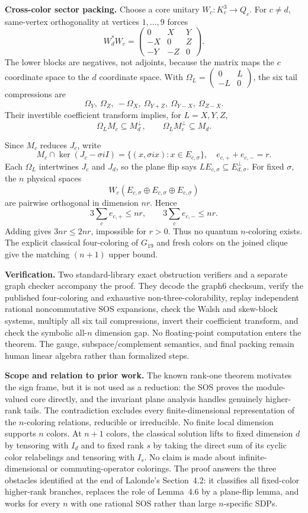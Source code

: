 \documentclass[10pt]{article}
\begin{document}
\textbf{Cross-color sector packing.}
Choose a core unitary $W_c:K_c^3\to Q_c$.  For $c\ne d$, same-vertex
orthogonality at vertices $1,\ldots,9$ forces
\[
 W_d^*W_c=\begin{pmatrix}0&X&Y\\-X&0&Z\\-Y&-Z&0\end{pmatrix}.
\]
The lower blocks are negatives, not adjoints, because the matrix maps the
$c$ coordinate space to the $d$ coordinate space.  With
$\Omega_L=\left(\begin{smallmatrix}0&L\\-L&0\end{smallmatrix}\right)$, the
six tail compressions are
\[
 \Omega_Y,\ \Omega_Z,\ -\Omega_X,\
 \Omega_{Y+Z},\ \Omega_{Y-X},\ \Omega_{Z-X}.
\]
Their invertible coefficient transform implies, for $L=X,Y,Z$,
\[
 \Omega_LM_c\subseteq M_d^\perp,
 \qquad \Omega_LM_c^\perp\subseteq M_d.
\]

Since $M_c$ reduces $J_c$, write
\[
 M_c\cap\ker(J_c-\sigma iI)
   =\{(x,\sigma ix):x\in E_{c,\sigma}\},
 \quad e_{c,+}+e_{c,-}=r.
\]
Each $\Omega_L$ intertwines $J_c$ and $J_d$, so the plane flip says
$L E_{c,\sigma}\subseteq E_{d,\sigma}^{\perp}$.  For fixed $\sigma$, the
$n$ physical spaces
\[
 W_c(E_{c,\sigma}\oplus E_{c,\sigma}\oplus E_{c,\sigma})
\]
are pairwise orthogonal in dimension $nr$.  Hence
\[
 3\sum_c e_{c,+}\le nr,\qquad3\sum_c e_{c,-}\le nr.
\]
Adding gives $3nr\le2nr$, impossible for $r>0$.  Thus no quantum
$n$-coloring exists.  The explicit classical four-coloring of $G_{19}$ and
fresh colors on the joined clique give the matching $(n+1)$ upper bound.

\textbf{Verification.}
Two standard-library exact obstruction verifiers and a separate graph checker
accompany the proof.  They decode the graph6 checksum, verify the published
four-coloring and exhaustive non-three-colorability, replay independent
rational noncommutative SOS expansions, check the Walsh and skew-block
systems, multiply all six tail compressions, invert their coefficient
transform, and check the symbolic all-$n$ dimension gap.  No floating-point
computation enters the theorem.  The gauge, subspace/complement semantics,
and final packing remain human linear algebra rather than formalized steps.

\textbf{Scope and relation to prior work.}
The known rank-one theorem motivates the sign frame, but it is not used as a
reduction: the SOS proves the module-valued core directly, and the invariant
plane analysis handles genuinely higher-rank tails.  The contradiction
excludes every finite-dimensional representation of the $n$-coloring
relations, reducible or irreducible.  No finite local dimension supports $n$
colors.  At $n+1$ colors, the classical solution lifts to fixed dimension $d$
by tensoring with $I_d$ and to fixed rank $s$ by taking the direct sum of its
cyclic color relabelings and tensoring with $I_s$.  No claim is made about
infinite-dimensional or commuting-operator colorings.  The proof answers the
three obstacles identified at the end of Lalonde's Section~4.2: it classifies
all fixed-color higher-rank branches, replaces the role of Lemma~4.6 by a
plane-flip lemma, and works for every $n$ with one rational SOS rather than
large $n$-specific SDPs.
\end{document}
